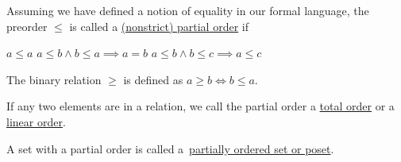 \begin{definition}
\begin{defenum}
    \item\label{def:order/partial} Assuming we have defined a notion of equality in our formal language, the preorder $\leq$ is called a \uline{(nonstrict) partial order} if
    \begin{description}
       $a \leq a$
       $a \leq b \land b \leq a \implies a = b$
       $a \leq b \land b \leq c \implies a \leq c$
    \end{description}

    The binary relation $\geq$ is defined as $a \geq b \iff b \leq a$.

    If any two elements are in a relation, we call the partial order a \uline{total order} or a \uline{linear order}.

    A set with a partial order is called a~\uline{partially ordered set or poset}.
  \end{defenum}
\end{definition}
